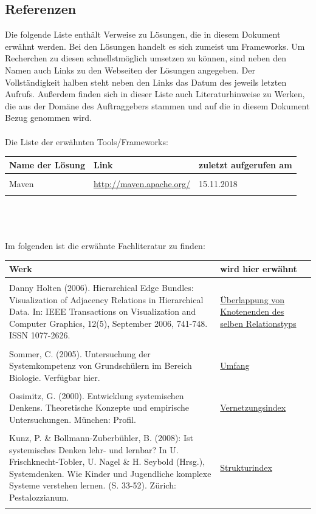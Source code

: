 \documentclass[enabledeprecatedfontcommands,fontsize=11pt,paper=a4,twoside]{scrartcl}
\begin{document}
\subsection{Referenzen}
Die folgende Liste enthält Verweise zu Lösungen, die in diesem Dokument erwähnt werden. Bei den Lösungen handelt es sich zumeist um Frameworks. Um Recherchen zu diesen schnellstmöglich umsetzen zu können, sind neben den Namen auch Links zu den Webseiten der Lösungen angegeben. Der Vollständigkeit halben steht neben den Links das Datum des jeweils letzten Aufrufs. Außerdem finden sich in dieser Liste auch Literaturhinweise zu Werken, die aus der Domäne des Auftraggebers stammen und auf die in diesem Dokument Bezug genommen wird. \\ \\
Die Liste der erwähnten Tools/Frameworks: \\
\begin{tabular}{p{}p{9cm}p{}}
	Name der Lösung & Link & zuletzt aufgerufen am \\ \hline \\
	Maven & \url{http://maven.apache.org/} & 15.11.2018 \\ \\
\end{tabular}
\\ \\ \\
Im folgenden ist die erwähnte Fachliteratur zu finden: \\
\begin{tabular}{p{11cm}p{5cm}}
	Werk & wird hier erwähnt \\ \hline \\
	Danny Holten (2006). Hierarchical Edge Bundles: Visualization of Adjacency Relations in Hierarchical Data. In: IEEE Transactions on Visualization and Computer Graphics, 12(5), September 2006, 741-748. ISSN 1077-2626. & \hyperlink{Überlappung von Knotenenden des selben Relationstyps}{Überlappung von Knotenenden des selben Relationstyps} \\ \\ 
	Sommer, C. (2005). Untersuchung der Systemkompetenz von Grundschülern im Bereich Biologie. Verfügbar hier. & \hyperlink{Umfang}{Umfang} \\ \\
	Ossimitz, G. (2000). Entwicklung systemischen Denkens. Theoretische Konzepte und empirische Untersuchungen. München: Profil. & \hyperlink{Vernetzungsindex}{Vernetzungsindex} \\ \\
	Kunz, P. \& Bollmann-Zuberbühler, B. (2008): Ist systemisches Denken lehr- und lernbar? In U. Frischknecht-Tobler, U. Nagel \& H. Seybold (Hrsg.), Systemdenken. Wie Kinder und Jugendliche komplexe Systeme verstehen lernen. (S. 33-52). Zürich: Pestalozzianum. & \hyperlink{Strukturindex}{Strukturindex} \\ \\
\end{tabular}
\newpage
\end{document}
